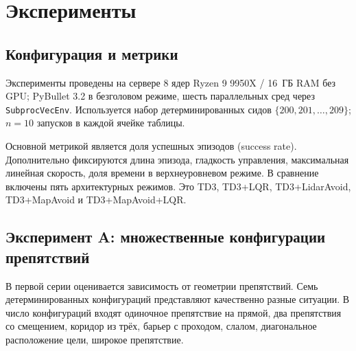 \documentclass[11pt]{article}
\begin{document}
\section{Эксперименты}
\label{sec:experiments}

\subsection{Конфигурация и метрики}
\label{sec:exp_setup}

Эксперименты проведены на сервере 8 ядер Ryzen 9 9950X / 16~ГБ RAM
без GPU; PyBullet 3.2 в безголовом режиме, шесть параллельных сред
через \verb|SubprocVecEnv|. Используется набор детерминированных сидов $\{200, 201, \ldots, 209\}$;
$n = 10$ запусков в каждой ячейке таблицы.

Основной метрикой является доля успешных эпизодов (success rate). Дополнительно
фиксируются длина эпизода, гладкость управления, максимальная линейная
скорость, доля времени в верхнеуровневом режиме. В сравнение включены пять архитектурных режимов. Это TD3, TD3+LQR, TD3+LidarAvoid, TD3+MapAvoid и TD3+MapAvoid+LQR.


\subsection{Эксперимент A: множественные конфигурации препятствий}
\label{sec:exp_a}

В первой серии оценивается зависимость от геометрии препятствий.
Семь детерминированных конфигураций представляют качественно разные ситуации. В число конфигураций входят одиночное препятствие на прямой, два препятствия со смещением, коридор из трёх, барьер с проходом, слалом, диагональное расположение цели, широкое препятствие.
\end{document}
